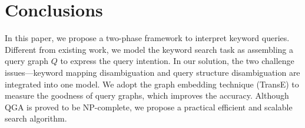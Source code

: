 \vspace{-0.05in}
\section{Conclusions}
In this paper, we propose a two-phase framework to interpret keyword queries. Different from existing work, we model the keyword search task as assembling a query graph $Q$ to express the query intention. In our solution, the two challenge issues---keyword mapping disambiguation and query structure disambiguation are integrated into one model. We adopt the graph embedding technique (TransE) to measure the goodness of query graphs, which improves the accuracy. Although QGA is proved to be NP-complete, we propose a practical efficient and scalable search algorithm. 

